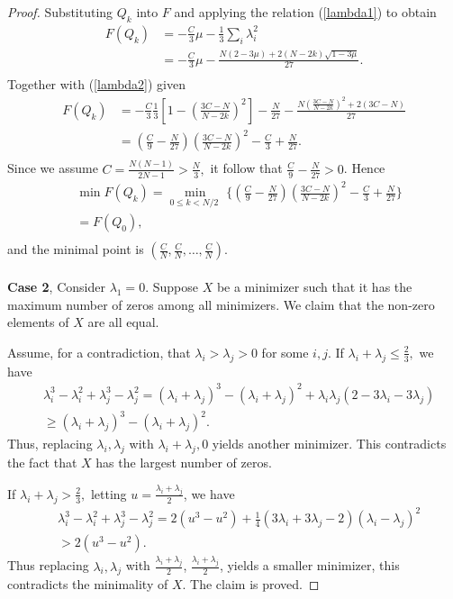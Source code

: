 \documentclass[11pt, reqno]{amsart}
\numberwithin{equation}{section}
\theoremstyle{definition}
\begin{document}
\begin{proof}
		Substituting $Q_k$ into $F$ and applying the relation (\ref{lambda1}) to obtain
		\begin{align*}
			F(Q_k)&=-\frac{C}{3}\mu -\frac{1}{3}\sum\limits_{i}{\lambda _{i}^{2}} \\ 
			& =-\frac{C}{3}\mu -\frac{N(2-3\mu )+2(N-2k)\sqrt{1-3\mu }}{27}. \\ 
		\end{align*}
		Together with (\ref{lambda2}) given
		\begin{align*}
			F(Q_k)&=-\frac{C}{3}\frac{1}{3}[1-{{\left( \frac{3C-N}{N-2k} \right)}^{2}}]-\frac{N}{27}-\frac{N{{\left( \frac{3C-N}{N-2k} \right)}^{2}}+2(3C-N)}{27} \\ 
			& =(\frac{C}{9}-\frac{N}{27}){{\left( \frac{3C-N}{N-2k} \right)}^{2}}-\frac{C}{3}+\frac{N}{27}. \\ 
		\end{align*}
		Since we assume $C=\frac{N(N-1)}{2N-1}>\frac{N}{3},$ it follow that $\frac{C}{9}-\frac{N}{27}>0$. Hence
		\begin{align*}
			& \min F(Q_k)=\underset{0\le k<{N}/{2}\;}{\mathop{\min }}\,\{(\frac{C}{9}-\frac{N}{27}){\left( \frac{3C-N}{N-2k} \right)^2}-\frac{C}{3}+\frac{N}{27}\} \\ 
			& =F(Q_0), \\ 
		\end{align*}
		and the minimal point is $\left( \frac{C}{N},\frac{C}{N},\ldots ,\frac{C}{N} \right).$\\\\
		\textbf{Case 2}, Consider ${\lambda }_1=0$.
		Suppose $X$ be a minimizer such that it has the maximum number of zeros among all minimizers. We claim that the non-zero elements of $X$ are all equal.
		
		Assume, for a contradiction, that ${\lambda }_i>{\lambda }_j>0$ for some $i,j$. If ${\lambda }_i+{\lambda }_j\le \frac{2}{3},$ we have
		\begin{align*}
			& \lambda _{i}^3-\lambda _{i}^2+\lambda _{j}^3-\lambda _{j}^2=({\lambda }_i+{\lambda }_j)^3-({\lambda }_i+{\lambda }_j)^2+{\lambda }_i{\lambda }_j(2-3{\lambda }_i-3{\lambda }_j) \\ 
			& \ge ({\lambda }_i+{\lambda }_j)^3-({\lambda }_i+{\lambda }_j)^2.
		\end{align*}
		Thus, replacing ${\lambda }_i,{\lambda }_j$ with ${\lambda }_i+{\lambda }_j,0$ yields another minimizer. This contradicts the fact that $X$ has the largest number of zeros.
		
		If  ${\lambda }_i+{\lambda }_j>\frac{2}{3},$ letting $u=\frac{{\lambda }_i+{\lambda }_j}{2}$, we have
		\begin{align*}
			& \lambda _{i}^3-\lambda _{i}^2+\lambda _{j}^3-\lambda _{j}^2=2(u^3-u^2)+\frac{1}{4}(3{\lambda }_i+3{\lambda }_j-2)({\lambda }_i-{\lambda }_j)^2 \\ 
			& >2(u^3-u^2). 
		\end{align*}
		Thus replacing ${\lambda }_i,{\lambda }_j$ with $\frac{{\lambda }_i+{\lambda }_j}{2}$, $\frac{{\lambda }_i+{\lambda }_j}{2}$, yields a smaller  minimizer, this contradicts the minimality of $X$. The claim is proved.
		

\end{proof}
\end{document}
